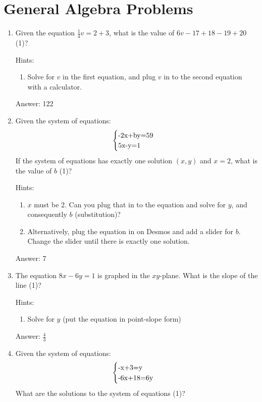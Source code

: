 \documentclass{article}
\begin{document}
\section{General Algebra Problems}

\begin{enumerate}

	\item{Given the equation $\frac{1}{4}v=2+3$, what is the value of $6v-17+18-19+20$ (1)?

	      Hints:
	      \begin{enumerate}
		      \item{Solve for $v$ in the first equation, and plug $v$ in to the second equation with a calculator.}
	      \end{enumerate}

	      Answer: 122}
	\item {Given the system of equations:
	      \[
		      \begin{array}{l}
			      \begin{cases}
				      $-2x+by=59$ & \\
				      $5x-y=1$
			      \end{cases}
		      \end{array}\]
	      If the system of equations has exactly one solution $(x,y)$ and $x=2$, what is the value of $b$ (1)?

	      Hints:
	      \begin{enumerate}
		      \item{$x$ must be 2. Can you plug that in to the equation and solve for $y$, and consequently $b$ (substitution)?}
		      \item{Alternatively, plug the equation in on Desmos and add a slider for $b$. Change the slider until there is exactly one solution.}
	      \end{enumerate}

	      Answer: 7
	      }

	\item {The equation $8x-6y=1$ is graphed in the $xy$-plane. What is the slope of the line (1)?

	      Hints:
	      \begin{enumerate}
		      \item{Solve for $y$ (put the equation in point-slope form)}
	      \end{enumerate}

	      Answer: $\frac{4}{3}$}
	\item {Given the system of equations:
	      \[
		      \begin{array}{l}
			      \begin{cases}
				      $-x+3=y$ & \\
				      $-6x+18=6y$
			      \end{cases}
		      \end{array}\]
	      What are the solutions to the system of equations (1)?

}
\end{enumerate}
\end{document}
